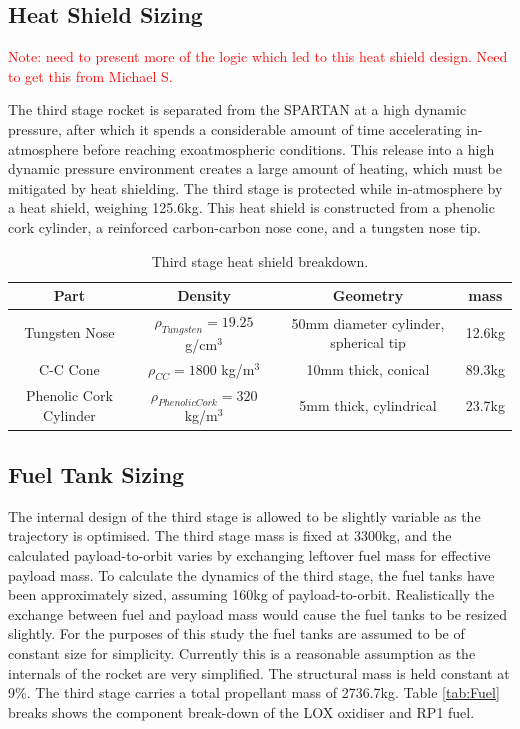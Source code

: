 \subsection{Heat Shield Sizing}
\textcolor{red}{Note: need to present more of the logic which led to this heat shield design. Need to get this from Michael S.}

The third stage rocket is separated from the SPARTAN at a high dynamic pressure, after which it spends a considerable amount of time accelerating in-atmosphere before reaching exoatmospheric conditions. This release into a high dynamic pressure environment creates a large amount of heating, which must be mitigated by heat shielding. 
The third stage is protected while in-atmosphere by a heat shield, weighing 125.6kg. This heat shield is constructed from a phenolic cork cylinder, a reinforced carbon-carbon nose cone, and a tungsten nose tip. 

		\begin{table}[h]
			\centering
\begin{tabular}{|c|c|c|c|}
	\hline  Part & Density & Geometry & mass \\ 
	\hline  Tungsten Nose & $\rho_{Tungsten} = 19.25$  g/cm$^3$ & 50mm diameter cylinder, spherical tip & 12.6kg \\ 
		\hline C-C Cone & $\rho_{CC} = 1800$  kg/m$^3$ & 10mm thick, conical & 89.3kg \\ 
			\hline Phenolic Cork Cylinder & $\rho_{Phenolic Cork} = 320$  kg/m$^3$ & 5mm thick, cylindrical & 23.7kg \\ 
	\hline 
\end{tabular} 
\caption{Third stage heat shield breakdown.}
\label{tab:3rdHeatShield}
\end{table}
		
		\subsection{Fuel Tank Sizing}
		The internal design of the third stage is allowed to be slightly variable as the trajectory is optimised. The third stage mass is fixed at 3300kg, and the calculated payload-to-orbit varies by exchanging leftover fuel mass for effective payload mass. To calculate the dynamics of the third stage, the fuel tanks have been approximately sized, assuming 160kg of payload-to-orbit. Realistically the exchange between fuel and payload mass would cause the fuel tanks to be resized slightly. For the purposes of this study the fuel tanks are assumed to be of constant size for simplicity. Currently this is a reasonable assumption as the internals of the rocket are very simplified. The structural mass is held constant at 9\%. The third stage carries a total propellant mass of 2736.7kg. Table \ref{tab:Fuel} breaks shows the component break-down of the LOX oxidiser and RP1 fuel.  
		
